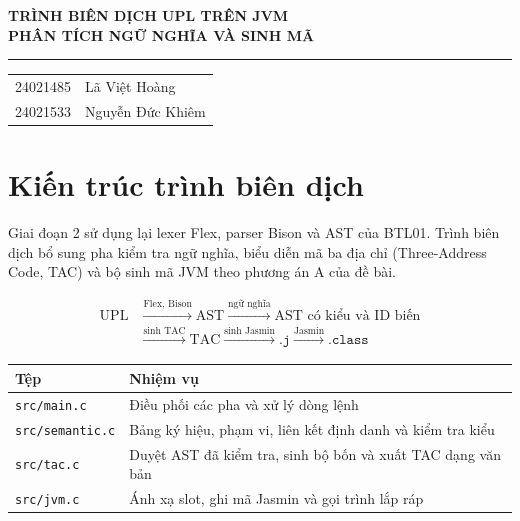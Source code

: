 \documentclass[11pt,a4paper]{article}
\begin{document}
\begin{flushleft}
  {\sffamily\bfseries\fontsize{22}{27}\selectfont\color{uplblue}
   TRÌNH BIÊN DỊCH UPL TRÊN JVM\\[2pt] PHÂN TÍCH NGỮ NGHĨA VÀ SINH MÃ\par}
  \vspace{0.8em}
  {\color{uplrule}\rule{\linewidth}{0.8pt}}\par
  \vspace{0.2em}
  \begin{tabular}{@{}l@{\hspace{0.6em}}l@{}}
    24021485 & Lã Việt Hoàng \\
    24021533 & Nguyễn Đức Khiêm \\
  \end{tabular}
\end{flushleft}

\section{Kiến trúc trình biên dịch}

Giai đoạn 2 sử dụng lại lexer Flex, parser Bison và AST của BTL01.
Trình biên dịch bổ sung pha kiểm tra ngữ nghĩa, biểu diễn mã ba địa chỉ
(Three-Address Code, TAC) và bộ sinh mã JVM theo phương án A của đề bài.

\[
  \begin{aligned}
    \text{UPL} &\xrightarrow{\text{Flex, Bison}} \text{AST}
    \xrightarrow{\text{ngữ nghĩa}} \text{AST có kiểu và ID biến} \\
    &\xrightarrow{\text{sinh TAC}} \text{TAC}
    \xrightarrow{\text{sinh Jasmin}} \texttt{.j}
    \xrightarrow{\text{Jasmin}} \texttt{.class}
  \end{aligned}
\]

\begin{tabularx}{\linewidth}{@{}l X@{}}
\toprule
\textbf{Tệp} & \textbf{Nhiệm vụ} \\
\midrule
\texttt{src/main.c} & Điều phối các pha và xử lý dòng lệnh \\
\texttt{src/semantic.c} & Bảng ký hiệu, phạm vi, liên kết định danh và kiểm tra kiểu \\
\texttt{src/tac.c} & Duyệt AST đã kiểm tra, sinh bộ bốn và xuất TAC dạng văn bản \\
\texttt{src/jvm.c} & Ánh xạ slot, ghi mã Jasmin và gọi trình lắp ráp \\
\bottomrule
\end{tabularx}
\end{document}
